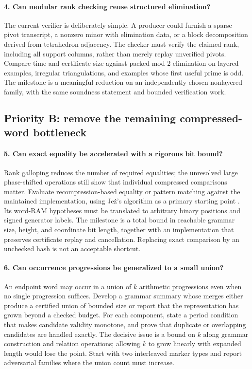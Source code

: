 \paragraph{4. Can modular rank checking reuse structured elimination?}
The current verifier is deliberately simple. A producer could furnish a
sparse pivot transcript, a nonzero minor with elimination data, or a block
decomposition derived from tetrahedron adjacency. The checker must verify
the claimed rank, including all support columns, rather than merely replay
unverified pivots. Compare time and certificate size against packed mod-$2$
elimination on layered examples, irregular triangulations, and examples
whose first useful prime is odd. The milestone is a meaningful reduction
on an independently chosen nonlayered family, with the same soundness
statement and bounded verification work.

\subsection{Priority B: remove the remaining compressed-word bottleneck}

\paragraph{5. Can exact equality be accelerated with a rigorous bit bound?}
Rank galloping reduces the number of required equalities; the unresolved
large phase-shifted operations still show that individual compressed
comparisons matter. Evaluate recompression-based equality or pattern
matching against the maintained implementation, using Je\.{z}'s algorithm
as a primary starting point \cite{jez}. Its word-RAM hypotheses must be
translated to arbitrary binary positions and signed generator labels.
The milestone is a total bound in reachable grammar size, height, and
coordinate bit length, together with an implementation that preserves
certificate replay and cancellation. Replacing exact comparison by an
unchecked hash is not an acceptable shortcut.

\paragraph{6. Can occurrence progressions be generalized to a small union?}
An endpoint word may occur in a union of $k$ arithmetic progressions even
when no single progression suffices. Develop a grammar summary whose
merges either produce a certified union of bounded size or report that
the representation has grown beyond a checked budget. For each component,
state a period condition that makes candidate validity monotone, and prove
that duplicate or overlapping candidates are handled exactly. The decisive
issue is a bound on $k$ along grammar construction and relation operations;
allowing $k$ to grow linearly with expanded length would lose the point.
Start with two interleaved marker types and report adversarial families
where the union count must increase.

